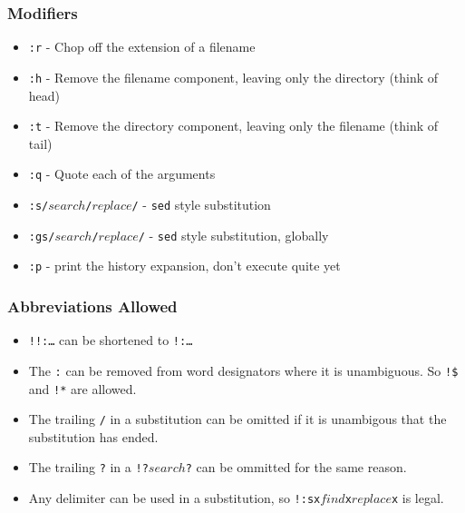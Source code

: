 \documentclass{beamer}
\begin{document}
\begin{frame}
    \frametitle{Modifiers}
    \begin{itemize}
        \item<2-> \texttt{:r} - Chop off the extension of a filename
        \item<3-> \texttt{:h} - Remove the filename component, leaving only the
            directory (think of head)
        \item<4-> \texttt{:t} - Remove the directory component, leaving only the
            filename (think of tail)
        \item<5-> \texttt{:q} - Quote each of the arguments
        \item<6-> \texttt{:s/$search$/$replace$/} - \texttt{sed} style substitution
        \item<7-> \texttt{:gs/$search$/$replace$/} - \texttt{sed} style
            substitution, globally
        \item<8-> \texttt{:p} - print the history expansion, don't execute quite
            yet
    \end{itemize}
\end{frame}

\begin{frame}
    \frametitle{Abbreviations Allowed}
    \begin{itemize}[<+->]
        \item \texttt{!!:\ldots} can be shortened to \texttt{!:\ldots}
        \item The \texttt{:} can be removed from word designators where it is
            unambiguous. So \texttt{!\$} and \texttt{!*} are allowed.
        \item The trailing \texttt{/} in a substitution can be omitted if it is
            unambigous that the substitution has ended.
        \item The trailing \texttt{?} in a \texttt{!?$search$?} can be ommitted
            for the same reason.
        \item Any delimiter can be used in a substitution, so
            \texttt{!:sx$find$x$replace$x} is legal.
    \end{itemize}
\end{frame}
\end{document}
